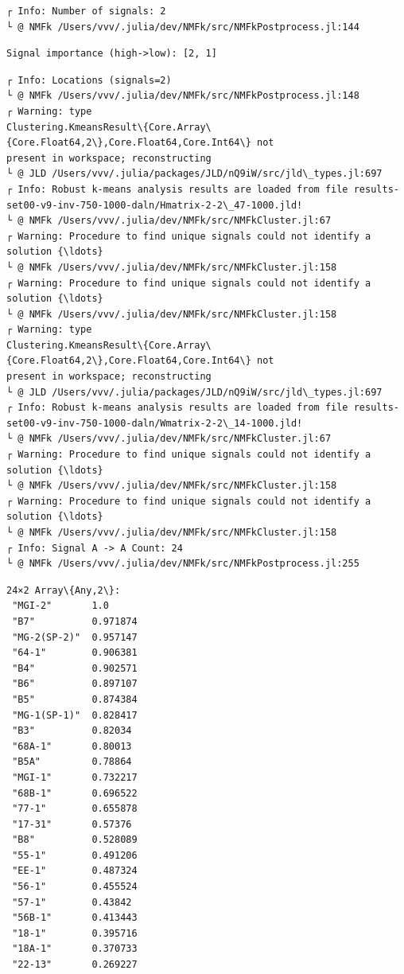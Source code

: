 \documentclass[11pt]{article}
\begin{document}
    \begin{Verbatim}[commandchars=\\\{\}]
┌ Info: Number of signals: 2
└ @ NMFk /Users/vvv/.julia/dev/NMFk/src/NMFkPostprocess.jl:144
    \end{Verbatim}

    \begin{Verbatim}[commandchars=\\\{\}]
Signal importance (high->low): [2, 1]
    \end{Verbatim}

    \begin{Verbatim}[commandchars=\\\{\}]
┌ Info: Locations (signals=2)
└ @ NMFk /Users/vvv/.julia/dev/NMFk/src/NMFkPostprocess.jl:148
┌ Warning: type
Clustering.KmeansResult\{Core.Array\{Core.Float64,2\},Core.Float64,Core.Int64\} not
present in workspace; reconstructing
└ @ JLD /Users/vvv/.julia/packages/JLD/nQ9iW/src/jld\_types.jl:697
┌ Info: Robust k-means analysis results are loaded from file results-
set00-v9-inv-750-1000-daln/Hmatrix-2-2\_47-1000.jld!
└ @ NMFk /Users/vvv/.julia/dev/NMFk/src/NMFkCluster.jl:67
┌ Warning: Procedure to find unique signals could not identify a solution {\ldots}
└ @ NMFk /Users/vvv/.julia/dev/NMFk/src/NMFkCluster.jl:158
┌ Warning: Procedure to find unique signals could not identify a solution {\ldots}
└ @ NMFk /Users/vvv/.julia/dev/NMFk/src/NMFkCluster.jl:158
┌ Warning: type
Clustering.KmeansResult\{Core.Array\{Core.Float64,2\},Core.Float64,Core.Int64\} not
present in workspace; reconstructing
└ @ JLD /Users/vvv/.julia/packages/JLD/nQ9iW/src/jld\_types.jl:697
┌ Info: Robust k-means analysis results are loaded from file results-
set00-v9-inv-750-1000-daln/Wmatrix-2-2\_14-1000.jld!
└ @ NMFk /Users/vvv/.julia/dev/NMFk/src/NMFkCluster.jl:67
┌ Warning: Procedure to find unique signals could not identify a solution {\ldots}
└ @ NMFk /Users/vvv/.julia/dev/NMFk/src/NMFkCluster.jl:158
┌ Warning: Procedure to find unique signals could not identify a solution {\ldots}
└ @ NMFk /Users/vvv/.julia/dev/NMFk/src/NMFkCluster.jl:158
┌ Info: Signal A -> A Count: 24
└ @ NMFk /Users/vvv/.julia/dev/NMFk/src/NMFkPostprocess.jl:255
    \end{Verbatim}

    
    \begin{Verbatim}[commandchars=\\\{\}]
24×2 Array\{Any,2\}:
 "MGI-2"       1.0
 "B7"          0.971874
 "MG-2(SP-2)"  0.957147
 "64-1"        0.906381
 "B4"          0.902571
 "B6"          0.897107
 "B5"          0.874384
 "MG-1(SP-1)"  0.828417
 "B3"          0.82034
 "68A-1"       0.80013
 "B5A"         0.78864
 "MGI-1"       0.732217
 "68B-1"       0.696522
 "77-1"        0.655878
 "17-31"       0.57376
 "B8"          0.528089
 "55-1"        0.491206
 "EE-1"        0.487324
 "56-1"        0.455524
 "57-1"        0.43842
 "56B-1"       0.413443
 "18-1"        0.395716
 "18A-1"       0.370733
 "22-13"       0.269227
    \end{Verbatim}
\end{document}
